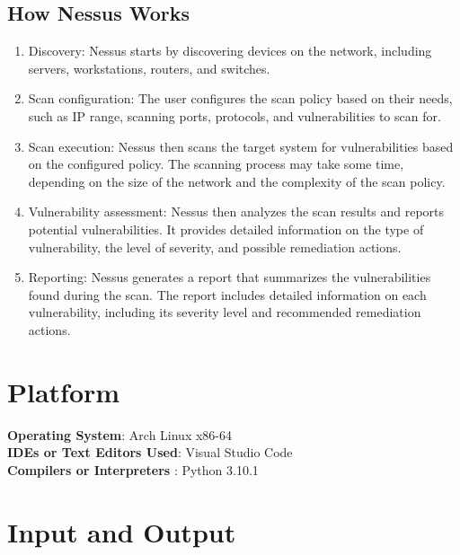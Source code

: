 \documentclass[11pt]{article}
\begin{document}
\subsection{How Nessus Works}
\begin{enumerate}
    \item Discovery: Nessus starts by discovering devices on the network, including servers, workstations, routers, and switches.
    \item Scan configuration: The user configures the scan policy based on their needs, such as IP range, scanning ports, protocols, and vulnerabilities to scan for.
    \item Scan execution: Nessus then scans the target system for vulnerabilities based on the configured policy. The scanning process may take some time, depending on the size of the network and the complexity of the scan policy.
    \item Vulnerability assessment: Nessus then analyzes the scan results and reports potential vulnerabilities. It provides detailed information on the type of vulnerability, the level of severity, and possible remediation actions.
    \item Reporting: Nessus generates a report that summarizes the vulnerabilities found during the scan. The report includes detailed information on each vulnerability, including its severity level and recommended remediation actions.
\end{enumerate}

\section{Platform}
\textbf{\textbf{Operating System}}: Arch Linux x86-64 \\
\textbf{\textbf{IDEs or Text Editors Used}}: Visual Studio Code\\
\textbf{\textbf{Compilers or Interpreters} }: Python 3.10.1\\

\section{Input and Output}

\begin{verbatim}
\end{verbatim}


% 
\end{document}
